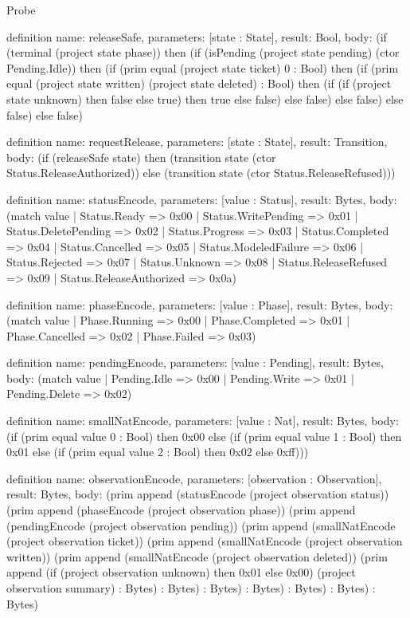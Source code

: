 \begin{lexlean}{Probe}
\begin{semanticmodule}
definition{
  name: releaseSafe,
  parameters: [state : State],
  result: Bool,
  body: (if (terminal (project state phase)) then (if (isPending (project state pending) (ctor Pending.Idle)) then (if (prim equal (project state ticket) 0 : Bool) then (if (prim equal (project state written) (project state deleted) : Bool) then (if (if (project state unknown) then false else true) then true else false) else false) else false) else false) else false)
}

definition{
  name: requestRelease,
  parameters: [state : State],
  result: Transition,
  body: (if (releaseSafe state) then (transition state (ctor Status.ReleaseAuthorized)) else (transition state (ctor Status.ReleaseRefused)))
}

definition{
  name: statusEncode,
  parameters: [value : Status],
  result: Bytes,
  body: (match value
    | Status.Ready => 0x00
    | Status.WritePending => 0x01
    | Status.DeletePending => 0x02
    | Status.Progress => 0x03
    | Status.Completed => 0x04
    | Status.Cancelled => 0x05
    | Status.ModeledFailure => 0x06
    | Status.Rejected => 0x07
    | Status.Unknown => 0x08
    | Status.ReleaseRefused => 0x09
    | Status.ReleaseAuthorized => 0x0a)
}

definition{
  name: phaseEncode,
  parameters: [value : Phase],
  result: Bytes,
  body: (match value
    | Phase.Running => 0x00
    | Phase.Completed => 0x01
    | Phase.Cancelled => 0x02
    | Phase.Failed => 0x03)
}

definition{
  name: pendingEncode,
  parameters: [value : Pending],
  result: Bytes,
  body: (match value | Pending.Idle => 0x00 | Pending.Write => 0x01 | Pending.Delete => 0x02)
}

definition{
  name: smallNatEncode,
  parameters: [value : Nat],
  result: Bytes,
  body: (if (prim equal value 0 : Bool) then 0x00 else (if (prim equal value 1 : Bool) then 0x01 else (if (prim equal value 2 : Bool) then 0x02 else 0xff)))
}

definition{
  name: observationEncode,
  parameters: [observation : Observation],
  result: Bytes,
  body: (prim append (statusEncode (project observation status)) (prim append (phaseEncode (project observation phase)) (prim append (pendingEncode (project observation pending)) (prim append (smallNatEncode (project observation ticket)) (prim append (smallNatEncode (project observation written)) (prim append (smallNatEncode (project observation deleted)) (prim append (if (project observation unknown) then 0x01 else 0x00) (project observation summary) : Bytes) : Bytes) : Bytes) : Bytes) : Bytes) : Bytes) : Bytes)
}


\end{semanticmodule}
\end{lexlean}
